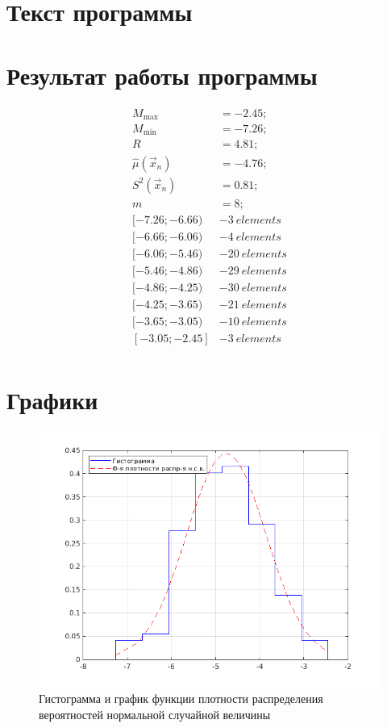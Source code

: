 \section{Текст программы}




\section{Результат работы программы}
\begin{align*}
	M_{\max}          &= -2.45; \\
	M_{\min}          &= -7.26; \\
	R                 &= 4.81;  \\
	\hat\mu(\vec x_n) &= -4.76; \\
	S^2(\vec x_n)     &= 0.81;  \\
	m                 &= 8;		\\
	[ -7.26 ; -6.66 ) &- 3\:elements	\\
	[ -6.66 ; -6.06 ) &- 4\:elements	\\
	[ -6.06 ; -5.46 ) &- 20\:elements	\\
	[ -5.46 ; -4.86 ) &- 29\:elements	\\
	[ -4.86 ; -4.25 ) &- 30\:elements	\\
	[ -4.25 ; -3.65 ) &- 21\:elements	\\
	[ -3.65 ; -3.05 ) &- 10\:elements	\\
	[ -3.05 ; -2.45 ] &- 3\:elements	\\
\end{align*}


\section{Графики}
\begin{figure}[h]
	\centering
	\includegraphics{../img/figure1}
	\caption{Гистограмма и график функции плотности распределения вероятностей нормальной случайной величины}
\end{figure}

